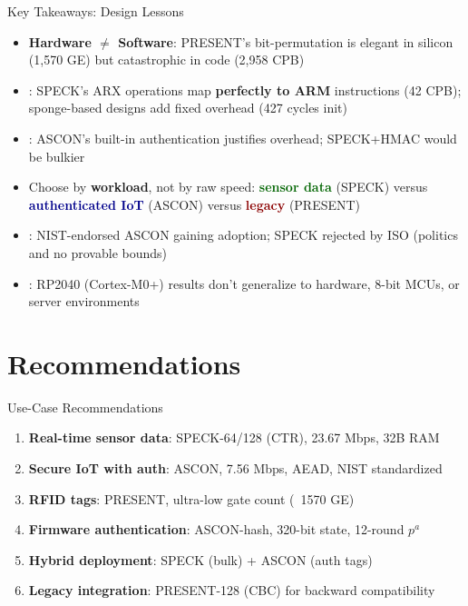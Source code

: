 \documentclass[aspectratio=169]{beamer}
\begin{document}
\begin{frame}{Key Takeaways: Design Lessons}
\textbf{}
\begin{itemize}
    \item \alert{\textbf{Hardware $\neq$ Software}}: PRESENT's bit-permutation is elegant in silicon (1,570 GE) but catastrophic in code (2,958 CPB)
    \item \textbf{}: SPECK's ARX operations map \textbf{perfectly to ARM} instructions (42 CPB); sponge-based designs add fixed overhead (427 cycles init)
    \item \textbf{}: ASCON's built-in authentication justifies overhead; SPECK+HMAC would be bulkier
\end{itemize}

\vspace{0.2cm}
\textbf{}
\begin{itemize}
    \item Choose by \alert{\textbf{workload}}, not by raw speed: \textcolor{darkgreen}{\textbf{sensor data}} (SPECK) versus \textcolor{darkblue}{\textbf{authenticated IoT}} (ASCON) versus \textcolor{darkred}{\textbf{legacy}} (PRESENT)
    \item \textbf{}: NIST-endorsed ASCON gaining adoption; SPECK rejected by ISO (politics and no provable bounds)
    \item \textbf{}: RP2040 (Cortex-M0+) results don't generalize to hardware, 8-bit MCUs, or server environments
\end{itemize}
\end{frame}


\section{Recommendations}

\begin{frame}{Use-Case Recommendations}
\begin{enumerate}
    \item \textbf{Real-time sensor data}: SPECK-64/128 (CTR), 23.67 Mbps, 32B RAM
    \item \textbf{Secure IoT with auth}: ASCON, 7.56 Mbps, AEAD, NIST standardized
    \item \textbf{RFID tags}: PRESENT, ultra-low gate count (~1570 GE)
    \item \textbf{Firmware authentication}: ASCON-hash, 320-bit state, 12-round $p^a$
    \item \textbf{Hybrid deployment}: SPECK (bulk) + ASCON (auth tags)
    \item \textbf{Legacy integration}: PRESENT-128 (CBC) for backward compatibility
\end{enumerate}
\end{frame}
\end{document}
